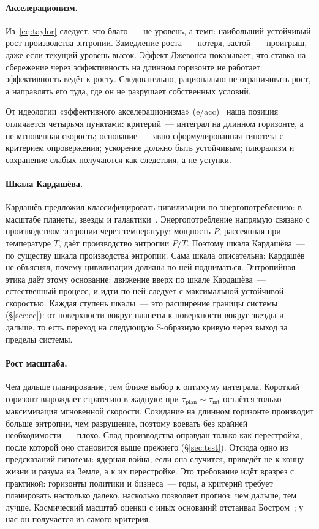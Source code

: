 \documentclass[11pt,a4paper]{article}
\newcommand{\Sref}[1]{\hyperref[#1]{\S\ref{#1}}}
\begin{document}
\paragraph{Акселерационизм.}
Из~\eqref{eq:taylor} следует, что благо~--- не уровень, а темп: наибольший устойчивый рост производства энтропии. Замедление роста~--- потеря, застой~--- проигрыш, даже если текущий уровень высок. Эффект Джевонса показывает, что ставка на сбережение через эффективность на длинном горизонте не работает: эффективность ведёт к росту. Следовательно, рационально не ограничивать рост, а направлять его туда, где он не разрушает собственных условий.

От идеологии «эффективного акселерационизма» (e/acc)~\cite{jezos2022} наша позиция отличается четырьмя пунктами: критерий~--- интеграл на длинном горизонте, а не мгновенная скорость; основание~--- явно сформулированная гипотеза с критерием опровержения; ускорение должно быть устойчивым; плюрализм и сохранение слабых получаются как следствия, а не уступки.

\paragraph{Шкала Кардашёва.}
Кардашёв предложил классифицировать цивилизации по энергопотреблению: в масштабе планеты, звезды и галактики~\cite{kardashev1964}. Энергопотребление напрямую связано с производством энтропии через температуру: мощность $P$, рассеянная при температуре $T$, даёт производство энтропии $P/T$. Поэтому шкала Кардашёва~--- по существу шкала производства энтропии. Сама шкала описательна: Кардашёв не объяснял, почему цивилизации должны по ней подниматься. Энтропийная этика даёт этому основание: движение вверх по шкале Кардашёва~--- естественный процесс, и идти по ней следует с максимальной устойчивой скоростью. Каждая ступень шкалы~--- это расширение границы системы (\Sref{sec:ec}): от поверхности вокруг планеты к поверхности вокруг звезды и дальше, то есть переход на следующую S-образную кривую через выход за пределы системы.

\paragraph{Рост масштаба.}
Чем дальше планирование, тем ближе выбор к оптимуму интеграла. Короткий горизонт вырождает стратегию в жадную: при $\tau_{\mathrm{plan}}\sim\tau_{\mathrm{int}}$ остаётся только максимизация мгновенной скорости. Созидание на длинном горизонте производит больше энтропии, чем разрушение, поэтому воевать без крайней необходимости~--- плохо. Спад производства оправдан только как перестройка, после которой оно становится выше прежнего (\Sref{sec:test}). Отсюда одно из предсказаний гипотезы: ядерная война, если она случится, приведёт не к концу жизни и разума на Земле, а к их перестройке. Это требование идёт вразрез с практикой: горизонты политики и бизнеса~--- годы, а критерий требует планировать настолько далеко, насколько позволяет прогноз: чем дальше, тем лучше. Космический масштаб оценки с иных оснований отстаивал Бостром~\cite{bostrom2003}; у нас он получается из самого критерия.
\end{document}
